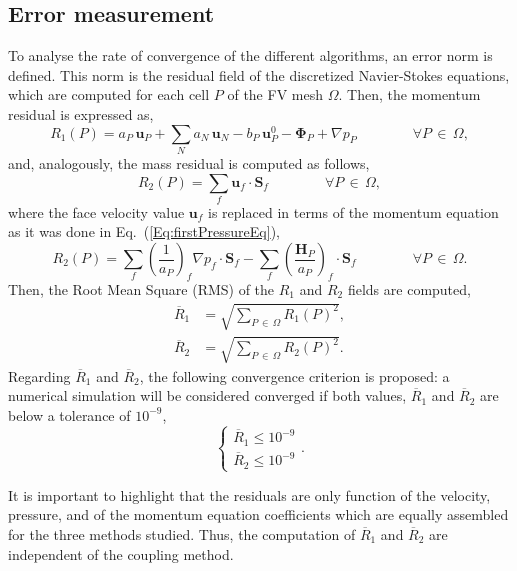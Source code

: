 \documentclass[final,3p,times,11pt,onecolumn]{myElsarticle}
\numberwithin{equation}{section}
\begin{document}
\subsection{Error measurement}
To analyse the rate of convergence of the different algorithms, an error norm is defined. This norm is the residual field of the discretized Navier-Stokes equations, which are computed for each cell $P$ of the FV mesh $\Omega$. Then, the momentum residual is expressed as,
\begin{equation}
\label{Eq:R1Discretized}
R_1(P)
=
a_P\,\boldsymbol{u}_P + \sum_{N} a_{N}\,\boldsymbol{u}_{N} 
-b_P\, \boldsymbol{u}^0_P - \boldsymbol{\Phi}_P + \nabla p_P
\qquad \qquad \forall P\,\in\,\Omega,
\end{equation}
and, analogously, the mass residual is computed as follows,
\begin{equation}
R_2(P)
=
\sum_f
\boldsymbol{u}_f
\cdot
\boldsymbol{S}_f
\qquad \qquad
\forall P\,\in\,\Omega,
\end{equation}
where the face velocity value $\boldsymbol{u}_f$ is replaced in terms of the momentum equation as it was done in Eq.~(\ref{Eq:firstPressureEq}),
\begin{equation}
\label{Eq:R2Discretized}
R_2(P)
=
\sum_f 
\left(
\frac{1}{a_P}
\right)_f 
\nabla p_f
\cdot
\boldsymbol{S}_f 
-
\sum_f
\left(
\frac{\boldsymbol{H}_P}
{a_P}
\right)_f 
\cdot 
\boldsymbol{S}_f
\qquad \qquad
\forall P\,\in\,\Omega.
\end{equation}
Then, the Root Mean Square (RMS) of the $R_1$ and $R_2$ fields are computed, 
\begin{align}
\overline{R}_1
&=
\sqrt
{
\sum_{P\,\in\,\Omega}
R_1(P)^2
},
\\
\overline{R}_2
&=
\sqrt
{
\sum_{P\,\in\,\Omega}
R_2(P)^2
}.
\end{align}
Regarding $\overline{R}_1$ and $\overline{R}_2$, the following convergence criterion is proposed: a numerical simulation will be considered converged if both values, $\overline{R}_1$ and $\overline{R}_2$  are below a tolerance of $10^{-9}$,
\begin{equation}
\label{Eq:convergencecriterion}
\left\lbrace
\begin{array}{c}
\overline{R}_1 \leq 10^{-9} \\
\overline{R}_2 \leq 10^{-9}
\end{array}
\right..
\end{equation}

It is important to highlight that the residuals are only function of the velocity, pressure, and of the momentum equation coefficients which are equally assembled for the three methods studied. Thus, the computation of $\overline{R}_1$ and $\overline{R}_2$ are independent of the coupling method. 
\end{document}
